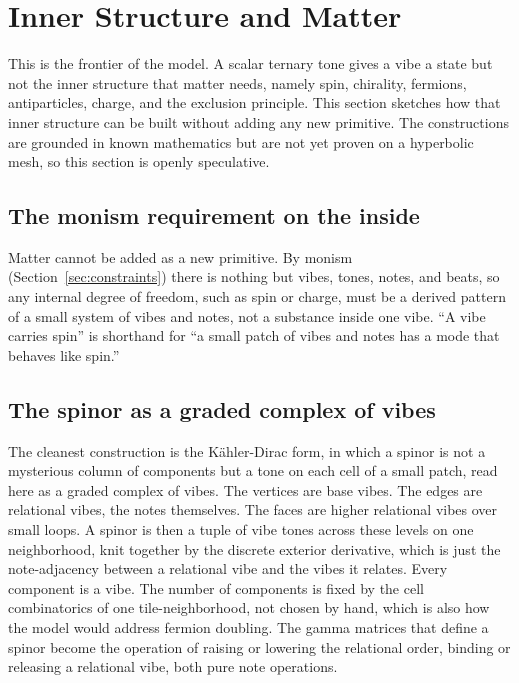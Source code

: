 \section{Inner Structure and Matter}
\label{sec:matter}

This is the frontier of the model. A scalar ternary tone gives a vibe a state but not the inner structure that matter needs, namely spin, chirality, fermions, antiparticles, charge, and the exclusion principle. This section sketches how that inner structure can be built without adding any new primitive. The constructions are grounded in known mathematics but are not yet proven on a hyperbolic mesh, so this section is openly speculative.

\subsection{The monism requirement on the inside}

Matter cannot be added as a new primitive. By monism (Section~\ref{sec:constraints}) there is nothing but vibes, tones, notes, and beats, so any internal degree of freedom, such as spin or charge, must be a derived pattern of a small system of vibes and notes, not a substance inside one vibe. ``A vibe carries spin'' is shorthand for ``a small patch of vibes and notes has a mode that behaves like spin.''

\subsection{The spinor as a graded complex of vibes}

The cleanest construction is the Kähler-Dirac form, in which a spinor is not a mysterious column of components but a tone on each cell of a small patch, read here as a graded complex of vibes. The vertices are base vibes. The edges are relational vibes, the notes themselves. The faces are higher relational vibes over small loops. A spinor is then a tuple of vibe tones across these levels on one neighborhood, knit together by the discrete exterior derivative, which is just the note-adjacency between a relational vibe and the vibes it relates. Every component is a vibe. The number of components is fixed by the cell combinatorics of one tile-neighborhood, not chosen by hand, which is also how the model would address fermion doubling. The gamma matrices that define a spinor become the operation of raising or lowering the relational order, binding or releasing a relational vibe, both pure note operations.

